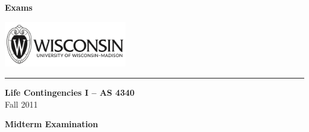 \documentclass[11pt,fleqn,oneside]{book}
\begin{document}


\normalsize
\newpage

\chapter[Exam]{}
\thispagestyle{empty}
\vspace{3cm}
\begin{center}
{\Huge \bf Exams}
\end{center}

\newpage

\thispagestyle{empty}
\setcounter{page}{1}


\thispagestyle{empty}

\includegraphics[height=2cm]{Graphs/wisc.png} 


\noindent \rule{\textwidth}{1.5pt}
    \begin{flushright}
    \textbf{\large Life Contingencies I -- AS 4340}\\  	
       {\large Fall 2011}\\
    \end{flushright}
\vspace{-1cm}

{\huge \textbf{Midterm Examination}}

\end{document}
